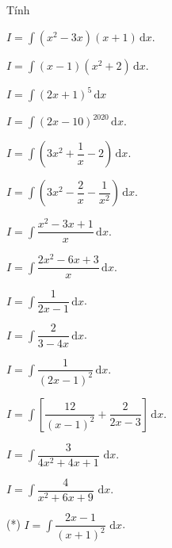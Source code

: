 \begin{vd}%
	Tính
    \begin{listEX}[1]
        \item $I=\displaystyle\int{(x^2-3x)(x+1)\mathrm{\,d}x}$.
        \item $I=\displaystyle\int{(x-1)(x^2+2)\mathrm{\,d}x}$.
        \item $I=\displaystyle\int{{{(2x+1)}^5}\mathrm{\,d}x}$
        \item $I=\displaystyle\int{{{(2x-10)}^{2020}}\mathrm{\,d}x}$.
        \item $I=\displaystyle\int{\left( 3x^2+\dfrac{1}{x}-2 \right)\mathrm{\,d}x}$.
        \item $I=\displaystyle\int{\left( 3x^2-\dfrac{2}{x}-\dfrac{1}{x^2} \right)\mathrm{\,d}x}$.
        \item $I=\displaystyle\int{\dfrac{x^2-3x+1}{x}\mathrm{\,d}x}$.
        \item $I=\displaystyle\int{\dfrac{2x^2-6x+3}{x}\mathrm{\,d}x}$.
        \item $I=\displaystyle\int{\dfrac{1}{2x-1}\mathrm{\,d}x}$.
        \item $I=\displaystyle\int{\dfrac{2}{3-4x}\mathrm{\,d}x}$.
        \item $I=\displaystyle\int{\dfrac{1}{{{\left( 2x-1 \right)}^2}}\mathrm{\,d}x}$.
        \item $I=\displaystyle\int{\left[ \dfrac{12}{{{\left( x-1 \right)}^2}}+\dfrac{2}{2x-3} \right]\mathrm{\,d}x}$.
        \item $I=\displaystyle\int{\dfrac{3}{4x^2+4x+1}\textrm{ d}x}$.
        \item $I=\displaystyle\int{\dfrac{4}{x^2+6x+9}\textrm{ d}x}$.
            \item (*) $I=\displaystyle\int{\dfrac{2x-1}{{{\left( x+1 \right)}^2}}\textrm{ d}x}$.
    \end{listEX}
\end{vd}

